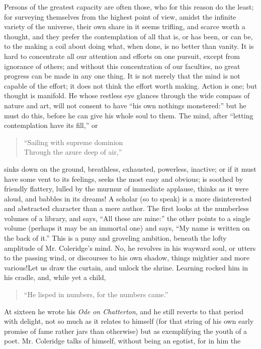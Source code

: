 Persons of the greatest capacity are often those, who for this
reason do the least; for surveying themselves from the highest
point of view, amidst the infinite variety of the universe, their
own share in it seems trifling, and scarce worth a thought, and
they prefer the contemplation of all that is, or has been, or can
be, to the making a coil about doing what, when done, is no better
than vanity. It is hard to concentrate all our attention and
efforts on one pursuit, except from ignorance of others; and
without this concentration of our faculties, no great progress can
be made in any one thing. It is not merely that the mind is not
capable of the effort; it does not think the effort worth making.
Action is one; but thought is manifold. He whose restless eye
glances through the wide compass of nature and art, will not
consent to have ``his own nothings monstered:'' but he must do this,
before he can give his whole soul to them. The mind, after
``letting contemplation have its fill,'' or
\begin{quote}
  ``Sailing with supreme dominion\\
  Through the azure deep of air,''
\end{quote}
sinks down on the ground, breathless, exhausted, powerless,
inactive; or if it must have some vent to its feelings, seeks the
most easy and obvious; is soothed by friendly flattery, lulled by
the murmur of immediate applause, thinks as it were aloud, and
babbles in its dreams!  A scholar (so to speak) is a more
disinterested and abstracted character than a mere author. The
first looks at the numberless volumes of a library, and says, ``All
these are mine:'' the other points to a single volume (perhaps it
may be an immortal one) and says, ``My name is written on the back
of it.'' This is a puny and groveling ambition, beneath the lofty
amplitude of Mr. Coleridge's mind. No, he revolves in his wayward
soul, or utters to the passing wind, or discourses to his own
shadow, things mightier and more various!\textemdash Let us draw the
curtain, and unlock the shrine. Learning rocked him in his cradle,
and, while yet a child,
\begin{quote}
  ``He lisped in numbers, for the numbers came.''
\end{quote}
At sixteen he wrote his \emph{Ode on Chatterton}, and he still reverts
to that period with delight, not so much as it relates to himself
(for that string of his own early promise of fame rather jars than
otherwise) but as exemplifying the youth of a poet. Mr. Coleridge
talks of himself, without being an egotist, for in him the
